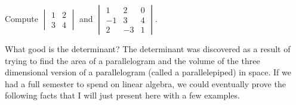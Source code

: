 \begin{problem}
Compute 
$\begin{vmatrix}
1&2\\
3&4
\end{vmatrix} 
$
and 
$\begin{vmatrix}
1&2&0\\
-1&3&4\\
2&-3&1
\end{vmatrix} 
$.
\end{problem}

What good is the determinant?  
The determinant was discovered as a result of trying to find the area of a parallelogram and the volume of the three dimensional version of a parallelogram (called a parallelepiped) in space. 
If we had a full semester to spend on linear algebra, we could eventually prove the following facts that I will just present here with a few examples.

